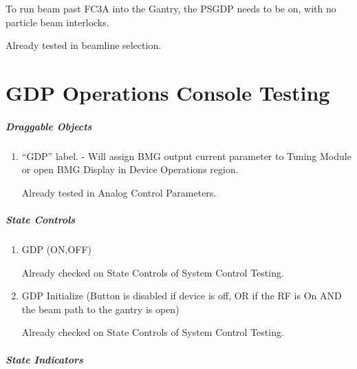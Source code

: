 \documentclass[11pt]{book}		%
\begin{document}
To run beam past FC3A into the Gantry, the PSGDP needs to be on, with no particle beam interlocks.


\color{red}

Already tested in beamline selection.

\color{black}






\chapter{GDP Operations Console Testing}

\paragraph{Draggable Objects}

\begin{enumerate}
 \item ``GDP'' label. - Will assign BMG output current parameter to Tuning Module or open BMG Display in Device Operations region.

\color{red}
Already tested in Analog Control Parameters.
\color{black}

\end{enumerate}

\paragraph{State Controls}

\begin{enumerate}
 \item GDP (ON,OFF)

\color{red}
Already checked on State Controls of System Control Testing.
\color{black}

 \item GDP Initialize (Button is disabled if device is off, OR if the RF is On AND the beam path to the gantry is open)

\color{red}
Already checked on State Controls of System Control Testing.
\color{black}

\end{enumerate}

\paragraph{State Indicators}
\end{document}
